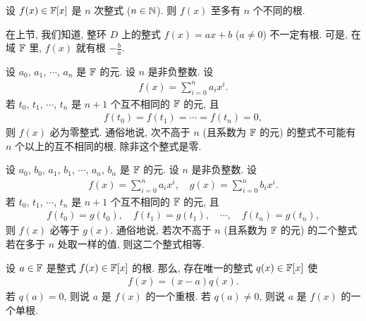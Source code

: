 \begin{proposition}
    设 $f(x) \in \mathbb{F}[x]$ 是 $n$ 次整式 ($n \in \mathbb{N}$). 则 $f(x)$ 至多有 $n$ 个不同的根.
\end{proposition}

\begin{remark}
    在上节, 我们知道, 整环 $D$ 上的整式 $f(x) = ax + b$ ($a \neq 0$) 不一定有根. 可是, 在域 $\mathbb{F}$ 里, $f(x)$ 就有根 $-\frac{b}{a}$.
\end{remark}

\begin{proposition}
    设 $a_0$, $a_1$, $\cdots$, $a_n$ 是 $\mathbb{F}$ 的元. 设 $n$ 是非负整数. 设
    \begin{align*}
        f(x) = \sum_{i = 0}^n a_i x^i.
    \end{align*}
    若 $t_0$, $t_1$, $\cdots$, $t_n$ 是 $n+1$ 个互不相同的 $\mathbb{F}$ 的元, 且
    \begin{align*}
        f(t_0) = f(t_1) = \cdots = f(t_n) = 0,
    \end{align*}
    则 $f(x)$ 必为零整式. 通俗地说, 次不高于 $n$ (且系数为 $\mathbb{F}$ 的元) 的整式不可能有 $n$ 个以上的互不相同的根, 除非这个整式是零.
\end{proposition}

\begin{proposition}
    设 $a_0$, $b_0$, $a_1$, $b_1$, $\cdots$, $a_n$, $b_n$ 是 $\mathbb{F}$ 的元. 设 $n$ 是非负整数. 设
    \begin{align*}
        f(x) = \sum_{i = 0}^n a_i x^i, \quad g(x) = \sum_{i = 0}^n b_i x^i.
    \end{align*}
    若 $t_0$, $t_1$, $\cdots$, $t_n$ 是 $n+1$ 个互不相同的 $\mathbb{F}$ 的元, 且
    \begin{align*}
        f(t_0) = g(t_0), \quad f(t_1) = g(t_1), \quad \cdots, \quad f(t_n) = g(t_n),
    \end{align*}
    则 $f(x)$ 必等于 $g(x)$. 通俗地说, 若次不高于 $n$ (且系数为 $\mathbb{F}$ 的元) 的二个整式若在多于 $n$ 处取一样的值, 则这二个整式相等.
\end{proposition}

\begin{definition}
    设 $a \in \mathbb{F}$ 是整式 $f(x) \in \mathbb{F}[x]$ 的根. 那么, 存在唯一的整式 $q(x) \in \mathbb{F}[x]$ 使
    \begin{align*}
        f(x) = (x - a) q(x).
    \end{align*}
    若 $q(a) = 0$, 则说 $a$ 是 $f(x)$ 的一个重根. 若 $q(a) \neq 0$, 则说 $a$ 是 $f(x)$ 的一个单根.
\end{definition}

